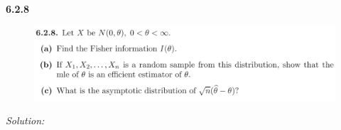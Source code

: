 \documentclass{book}
\theoremstyle{definition}
\begin{document}
\newpage
\noindent \textbf{6.2.8}
\begin{figure}[!htb]
	\centering
	\includegraphics[scale=0.25]{628}
\end{figure}


\noindent \textit{Solution:}
\end{document}
